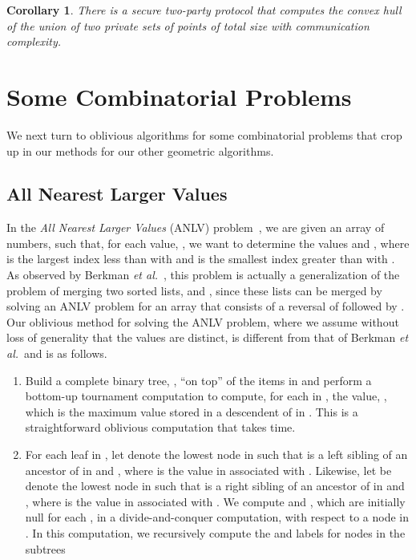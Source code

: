 \documentclass[11pt]{article}
\newtheorem{corollary}[theorem]{Corollary}
\begin{document}
{\begin{corollary} \label{cor:convex-hull} There is a secure two-party
  protocol that computes the convex hull of the union of two private
  sets of points of total size  with  communication
  complexity.
\end{corollary}



\section{Some Combinatorial Problems}
We next turn to oblivious algorithms for some combinatorial problems that
crop up in our methods for our other geometric algorithms.

\subsection{All Nearest Larger Values}
In the \emph{All Nearest Larger Values} (ANLV) 
problem~\cite{bsv-odlpa-93}, we are given an array
 of  numbers, such that, for each value, ,
we want to determine the values  and , where 
 is the largest index less than  with  and
 is the smallest index greater than  with .
As observed by Berkman {\it et al.}~\cite{bsv-odlpa-93},
this problem is actually a generalization of the problem of merging two
sorted lists,  and , since these lists can be merged by
solving an ANLV problem for an array that consists of 
a reversal of  followed by .
Our oblivious method for solving the ANLV problem,
where we assume without
loss of generality that the values are distinct, 
is different from that of Berkman {\it et al.}~and is as follows.
\begin{enumerate}
\item
Build a complete binary tree, , ``on top'' of the items in 
and perform a bottom-up tournament computation to compute, for each
 in , the value, , which is the maximum value stored in a
descendent of  in .
This is a straightforward oblivious computation that takes  time.
\item
For each leaf  in ,
let  denote the lowest node in  
such that  is a left sibling of an ancestor of  in  and
, where  is the value in  associated with .
Likewise, let  be denote the lowest node in  
such that  is a right sibling of an ancestor of  in  and
, where  is the value in  associated with .
We compute  and , which are initially null for each ,
in a divide-and-conquer computation, with respect to a node  in .
In this computation,
we recursively compute the  and  labels for nodes in the subtrees

\end{enumerate}}
\end{document}
